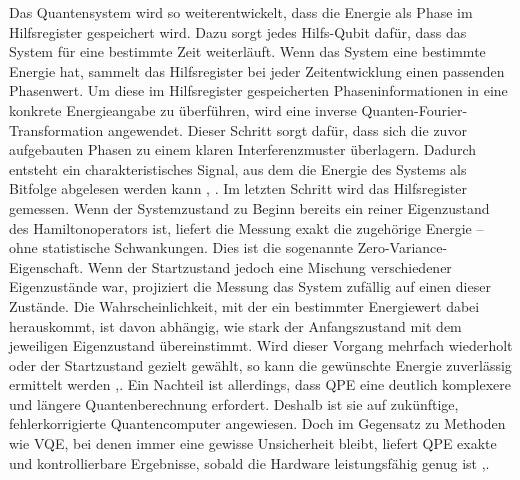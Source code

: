 Das Quantensystem wird so weiterentwickelt, dass die Energie als Phase im Hilfsregister gespeichert wird. Dazu sorgt jedes Hilfs-Qubit dafür, dass das System für eine bestimmte Zeit weiterläuft. Wenn das System eine bestimmte Energie hat, sammelt das Hilfsregister bei jeder Zeitentwicklung einen passenden Phasenwert. Um diese im Hilfsregister gespeicherten Phaseninformationen in eine konkrete Energieangabe zu überführen, wird eine inverse Quanten-Fourier-Transformation angewendet. Dieser Schritt sorgt dafür, dass sich die zuvor aufgebauten Phasen zu einem klaren Interferenzmuster überlagern. Dadurch entsteht ein charakteristisches Signal, aus dem die Energie des Systems als Bitfolge abgelesen werden kann \citealp[7]{vonburgQuantumComputingEnhanced2021}, \citealp[25]{mottaEmergingQuantumComputing2022}. Im letzten Schritt wird das Hilfsregister gemessen. Wenn der Systemzustand zu Beginn bereits ein reiner Eigenzustand des Hamiltonoperators ist, liefert die Messung exakt die zugehörige Energie – ohne statistische Schwankungen. Dies ist die sogenannte Zero-Variance-Eigenschaft. Wenn der Startzustand jedoch eine Mischung verschiedener Eigenzustände war, projiziert die Messung das System zufällig auf einen dieser Zustände. Die Wahrscheinlichkeit, mit der ein bestimmter Energiewert dabei herauskommt, ist davon abhängig, wie stark der Anfangszustand mit dem jeweiligen Eigenzustand übereinstimmt. Wird dieser Vorgang mehrfach wiederholt oder der Startzustand gezielt gewählt, so kann die gewünschte Energie zuverlässig ermittelt werden \citealp[7]{vonburgQuantumComputingEnhanced2021},\citealp[25]{mottaEmergingQuantumComputing2022}.
Ein Nachteil ist allerdings, dass QPE eine deutlich komplexere und längere Quantenberechnung erfordert. Deshalb ist sie auf zukünftige, fehlerkorrigierte Quantencomputer angewiesen. Doch im Gegensatz zu Methoden wie VQE, bei denen immer eine gewisse Unsicherheit bleibt, liefert QPE exakte und kontrollierbare Ergebnisse, sobald die Hardware leistungsfähig genug ist \citealp[7]{vonburgQuantumComputingEnhanced2021},\citealp[25]{mottaEmergingQuantumComputing2022}.



